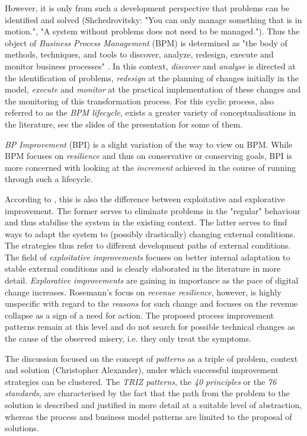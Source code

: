 \documentclass[11pt,a4paper]{article}
\begin{document}
However, it is only from such a development perspective that problems can be
identified and solved (Shchedrovitsky: "You can only manage something that is
in motion.", "A system without problems does not need to be managed."). Thus
the object of \emph{Business Process Management} (BPM) is determined as "the
body of methods, techniques, and tools to discover, analyze, redesign, execute
and monitor business processes" \cite{Lindskog2018}. In this context,
\emph{discover} and \emph{analyse} is directed at the identification of
problems, \emph{redesign} at the planning of changes initially in the model,
\emph{execute} and \emph{monitor} at the practical implementation of these
changes and the monitoring of this transformation process. For this cyclic
process, also referred to as the \emph{BPM lifecycle}, exists a greater
variety of conceptualisations in the literature, see the slides of the
presentation for some of them.

\emph{BP Improvement} (BPI) is a slight variation of the way to view on BPM.
While BPM focuses on \emph{resilience} and thus on conservative or conserving
goals, BPI is more concerned with looking at the \emph{increment} achieved in
the course of running through such a lifecycle.

According to \cite{Rosemann2020}, this is also the difference between
exploitative and explorative improvement. The former serves to eliminate
problems in the "regular" behaviour and thus stabilise the system in the
existing context. The latter serves to find ways to adapt the system to
(possibly drastically) changing external conditions. The strategies thus refer
to different development paths of external conditions. The field of
\emph{exploitative improvements} focuses on better internal adaptation to
stable external conditions and is clearly elaborated in the literature in more
detail. \emph{Explorative improvements} are gaining in importance as the pace
of digital change increases. Rosemann's focus on \emph{revenue resilience},
however, is highly unspecific with regard to the \emph{reasons} for such
change and focuses on the revenue collapse as a sign of a need for action. The
proposed process improvement patterns remain at this level and do not search
for possible technical changes as the cause of the observed misery, i.e. they
only treat the symptoms.

The discussion focused on the concept of \emph{patterns} as a triple of
problem, context and solution (Christopher Alexander), under which successful
improvement strategies can be clustered. The \emph{TRIZ patterns}, the
\emph{40 principles} or the \emph{76 standards}, are characterised by the fact
that the path from the problem to the solution is described and justified in
more detail at a suitable level of abstraction, whereas the process and
business model patterns are limited to the proposal of solutions.
\end{document}
